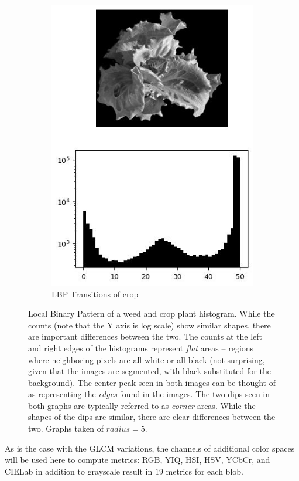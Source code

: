 \documentclass[letterpaper, notitlepage]{report}
\begin{document}
\begin{figure}[H]
\begin{subfigure}{0.48\linewidth}
		\includegraphics[scale=.7]{./figures/lbp-right.jpg}
		\caption{LBP Transitions of crop}
		\label{subfig:lbp-crop}		
	\end{subfigure}%
	\caption[Local Binary Pattern of a weed and crop plant histogram]{Local Binary Pattern of a weed and crop plant histogram. While the counts (note that the Y axis is log scale) show similar shapes, there are important differences between the two. The counts at the left and right edges of the histograms represent \textit{flat} areas -- regions where neighboring pixels are all white or all black (not surprising, given that the images are segmented, with black substituted for the background). The center peak seen in both images can be thought of as representing the \textit{edges} found in the images. The two dips seen in both graphs are typically referred to as \textit{corner} areas. While the shapes of the dips are similar, there are clear differences between the two. Graphs taken of $radius=5$.}
	\label{fig:lbp}
\end{figure}

As is the case with the GLCM variations, the channels of additional color spaces will be used here to compute metrics: RGB, YIQ, HSI, HSV, YCbCr, and CIELab in addition to grayscale result in $19$ metrics for each blob.
\end{document}
